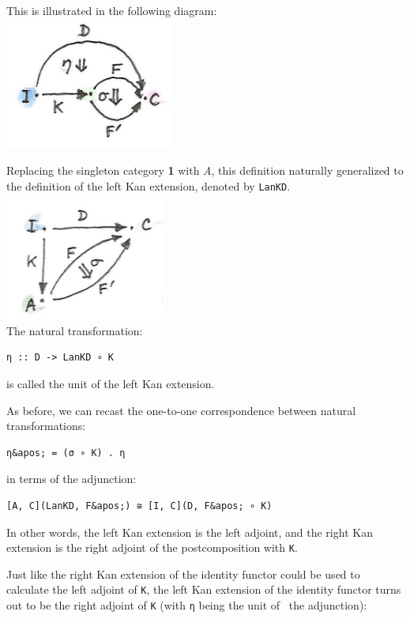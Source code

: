 This is illustrated in the following diagram:\\
\includegraphics[width=2.19792in]{images/kan112.jpg}

Replacing the singleton category \textbf{1} with \emph{A}, this
definition naturally generalized to the definition of the left Kan
extension, denoted by \texttt{LanKD}.\\
\includegraphics[width=2.06250in]{images/kan12.jpg}\\
The natural transformation:

\begin{verbatim}
η :: D -> LanKD ∘ K
\end{verbatim}

is called the unit of the left Kan extension.

As before, we can recast the one-to-one correspondence between natural
transformations:

\begin{verbatim}
η&apos; = (σ ∘ K) . η
\end{verbatim}

in terms of the adjunction:

\begin{verbatim}
[A, C](LanKD, F&apos;) ≅ [I, C](D, F&apos; ∘ K)
\end{verbatim}

In other words, the left Kan extension is the left adjoint, and the
right Kan extension is the right adjoint of the postcomposition with
\texttt{K}.

Just like the right Kan extension of the identity functor could be used
to calculate the left adjoint of \texttt{K}, the left Kan extension of
the identity functor turns out to be the right adjoint of \texttt{K}
(with \texttt{η} being the unit of~ the adjunction):


